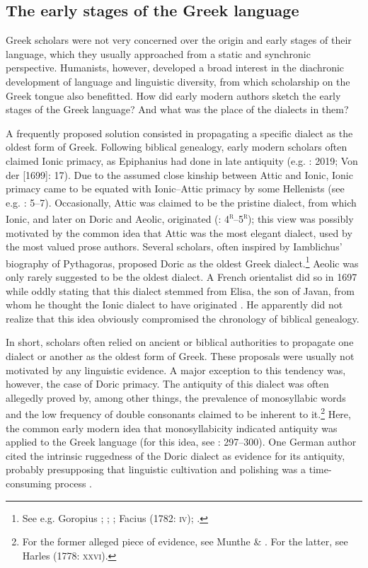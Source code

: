 \subsection{The early stages of the Greek language}
\hypertarget{Toc19704838}{}
Greek scholars were not very concerned over the origin and early stages of their language, which they usually approached from a static and synchronic perspective. Humanists, however, developed a broad interest in the diachronic development of language and linguistic diversity, from which scholarship on the Greek tongue also benefitted. How did early modern authors sketch the early stages of the Greek language? And what was the place of the dialects in them?

A frequently proposed solution consisted in propagating a specific dialect as the oldest form of Greek. Following biblical genealogy, early modern scholars often claimed Ionic primacy, as Epiphanius had done in late antiquity (e.g. \citealt{Alsted1630}: 2019; Von der \citealt{Hardt1705} [1699]: 17). Due to the assumed close kinship between Attic and Ionic, Ionic primacy came to be equated with Ionic–Attic primacy by some Hellenists (see e.g. \citealt{Schmidt1604}: 5–7). Occasionally, Attic was claimed to be the pristine dialect, from which Ionic, and later on Doric and Aeolic, originated (\citealt{Baile1588}: 4\textsc{\textsuperscript{r}}–5\textsc{\textsuperscript{r}}); this view was possibly motivated by the common idea that Attic was the most elegant dialect, used by the most valued prose authors. Several scholars, often inspired by Iamblichus’ biography of Pythagoras, proposed Doric as the oldest Greek dialect.\footnote{See e.g. Goropius \citet[860]{Becanus1569}; \citet[29]{Burton1657}; \citet[118]{Mazzocchi1754}; Facius (1782: \textsc{iv}); \citet[21]{Gedike1782}.} Aeolic was only rarely suggested to be the oldest dialect. A French orientalist did so in 1697 while oddly stating that this dialect stemmed from Elisa, the son of Javan, from whom he thought the Ionic dialect to have originated \citep[110]{Thomassin1697}. He apparently did not realize that this idea obviously compromised the chronology of biblical genealogy.

In short, scholars often relied on ancient or biblical authorities to propagate one dialect or another as the oldest form of Greek. These proposals were usually not motivated by any linguistic evidence. A major exception to this tendency was, however, the case of Doric primacy. The antiquity of this dialect was often allegedly proved by, among other things, the prevalence of monosyllabic words and the low frequency of double consonants claimed to be inherent to it.\footnote{For the former alleged piece of evidence, see Munthe \& \citet[17]{Heiberg1748}. For the latter, see Harles (1778: \textsc{xxvi).}} Here, the common early modern idea that monosyllabicity indicated antiquity was applied to the Greek language (for this idea, see \citealt{Jansen1995}: 297–300). One German author cited the intrinsic ruggedness of the Doric dialect as evidence for its antiquity, probably presupposing that linguistic cultivation and polishing was a time-consuming process \citep[21]{Gedike1782}.


